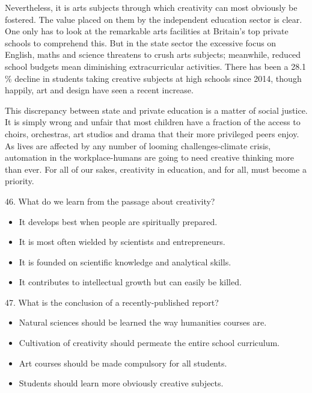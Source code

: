 \documentclass[UTF8,11pt]{ctexart}
\begin{document}
Nevertheless, it is arts subjects through which creativity can most obviously be fostered. The value placed on them by the independent education sector is clear. One only has to look at the remarkable arts facilities at Britain's top private schools to comprehend this. But in the state sector the excessive focus on English, maths and science threatens to crush arts subjects; meanwhile, reduced school budgets mean diminishing extracurricular activities. There has been a 28.1 \% decline in students taking creative subjects at high schools since 2014, though happily, art and design have seen a recent increase.


This discrepancy between state and private education is a matter of social justice. It is simply wrong and unfair that most children have a fraction of the access to choirs, orchestras, art studios and drama that their more privileged peers enjoy. As lives are affected by any number of looming challenges-climate crisis, automation in the workplace-humans are going to need creative thinking more than ever. For all of our sakes, creativity in education, and for all, must become a priority.


46. What do we learn from the passage about creativity?


\begin{itemize}[leftmargin=2em,itemsep=.2em,topsep=.4em]\item[A.] It develops best when people are spiritually prepared.
\item[B.] It is most often wielded by scientists and entrepreneurs.
\item[C.] It is founded on scientific knowledge and analytical skills.
\item[D.] It contributes to intellectual growth but can easily be killed.
\end{itemize}

47. What is the conclusion of a recently-published report?


\begin{itemize}[leftmargin=2em,itemsep=.2em,topsep=.4em]\item[A.] Natural sciences should be learned the way humanities courses are.
\item[B.] Cultivation of creativity should permeate the entire school curriculum.
\item[C.] Art courses should be made compulsory for all students.
\item[D.] Students should learn more obviously creative subjects.
\end{itemize}
\end{document}
